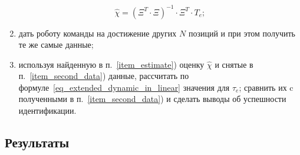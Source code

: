 \begin{enumerate}
        \begin{equation}
            \hat\chi = ( \Xi^T \!\!\cdot \Xi)^{-1} \cdot \Xi^T \cdot T_e;
        \end{equation}
    \item \label{item_second_data}дать роботу команды на достижение других $N$ позиций и при этом получить те же самые данные;
    \item используя найденную в п.~\ref{item_estimate}) оценку $\hat{\chi}$ и снятые в п.~\ref{item_second_data}) данные, рассчитать по формуле~\eqref{eq_extended_dynamic_in_linear} значения для $\tau_e$; сравнить их c полученными в п.~\ref{item_second_data}) и сделать выводы об успешности идентификации.
\end{enumerate}

\subsection{Результаты}
\newpage
